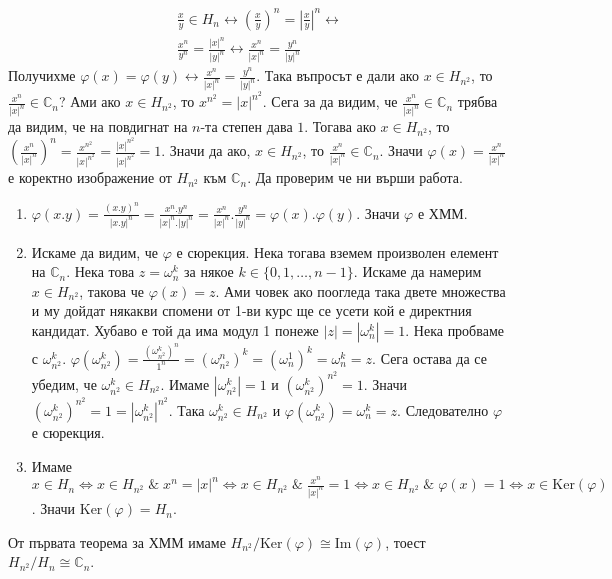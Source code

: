 \documentclass[12pt]{article}
\begin{document}
\begin{enumerate}[label=\alph*)]
\begin{align*}
        \displaystyle\frac{x}{y} \in H_n \longleftrightarrow 
        \left(\displaystyle\frac{x}{y}\right)^n = \left|\displaystyle\frac{x}{y}\right|^n \longleftrightarrow \\
        \displaystyle\frac{x^n}{y^n} = \displaystyle\frac{|x|^n}{|y|^n} \longleftrightarrow
        \displaystyle\frac{x^n}{|x|^n} = \displaystyle\frac{y^n}{|y|^n}
    \end{align*}
    Получихме \(\varphi(x) = \varphi(y) \longleftrightarrow \displaystyle\frac{x^n}{|x|^n} = \displaystyle\frac{y^n}{|y|^n}\).
    Така въпросът е дали ако \(x \in H_{n^2}\), то \(\displaystyle\frac{x^n}{|x|^n} \in \mathbb{C}_n\)?
    Ами ако \(x \in H_{n^2}\), то \(x^{n^2} = |x|^{n^2}\).
    Сега за да видим, че \(\displaystyle\frac{x^n}{|x|^n} \in \mathbb{C}_n\)
    трябва да видим, че на повдигнат на \(n\)-та степен дава \(1\).
    Тогава ако \(x \in H_{n^2}\), то \(\left(\displaystyle\frac{x^n}{|x|^n}\right)^n =
    \displaystyle\frac{x^{n^2}}{|x|^{n^2}} =
    \displaystyle\frac{|x|^{n^2}}{|x|^{n^2}} = 1\).
    Значи да ако, \(x \in H_{n^2}\), то \(\displaystyle\frac{x^n}{|x|^n} \in \mathbb{C}_n\).
    Значи \(\varphi(x) = \displaystyle\frac{x^n}{|x|^n}\) е коректно изображение от \(H_{n^2}\) към \(\mathbb{C}_n\). Да проверим че ни върши работа.
    \begin{enumerate}
        \item \(\varphi(x.y) = \displaystyle\frac{(x.y)^n}{|x.y|^n} = \displaystyle\frac{x^n.y^n}{|x|^n.|y|^n} = \displaystyle\frac{x^n}{|x|^n}. \displaystyle\frac{y^n}{|y|^n} = \varphi(x) . \varphi(y)\). Значи \(\varphi\) е ХММ.
        \item Искаме да видим, че \(\varphi\) е сюрекция.
        Нека тогава вземем произволен елемент на \(\mathbb{C}_n\).
        Нека това \(z = \omega_n^k\) за някое \(k \in \{0, 1, \dots, n - 1\}\).
        Искаме да намерим \(x \in H_{n^2}\), такова че \(\varphi(x) = z\).
        Ами човек ако поогледа така двете множества и му дойдат някакви спомени от 1-ви курс ще се усети кой е директния кандидат. Хубаво е той да има модул 1 понеже \(|z| = |\omega_n^k| = 1\). Нека пробваме с \(\omega_{n^2}^k\).
        \(\varphi(\omega_{n^2}^k) = \displaystyle\frac{(\omega_{n^2}^k)^n}{1^n} = (\omega_{n^2}^n)^k = (\omega_n^1)^k = \omega_n^k = z\).
        Сега остава да се убедим, че \(\omega_{n^2}^k \in H_{n^2}\).
        Имаме \(|\omega_{n^2}^k| = 1\) и \((\omega_{n^2}^k)^{n^2} = 1\).
        Значи \((\omega_{n^2}^k)^{n^2} = 1 = |\omega_{n^2}^k|^{n^2}\).
        Така \(\omega_{n^2}^k \in H_{n^2}\) и \(\varphi(\omega_{n^2}^k) = \omega_n^k = z\). Следователно \(\varphi\) е сюрекция.
        \item Имаме \(x \in H_n \iff x \in H_{n^2} \; \& \; x^n = |x|^n
        \iff x \in H_{n^2} \; \& \; \displaystyle\frac{x^n}{|x|^n} = 1 \iff
        x \in H_{n^2} \; \& \; \varphi(x) = 1 \iff x \in \mathrm{Ker}(\varphi)\).
        Значи \(\mathrm{Ker}(\varphi) = H_n\).
    \end{enumerate}
    От първата теорема за ХММ имаме \(H_{n^2} / \mathrm{Ker}(\varphi) \cong \mathrm{Im}(\varphi)\), тоест \(H_{n^2}  / H_{n}  \cong \mathbb{C}_n\).
\end{enumerate}
\end{document}
